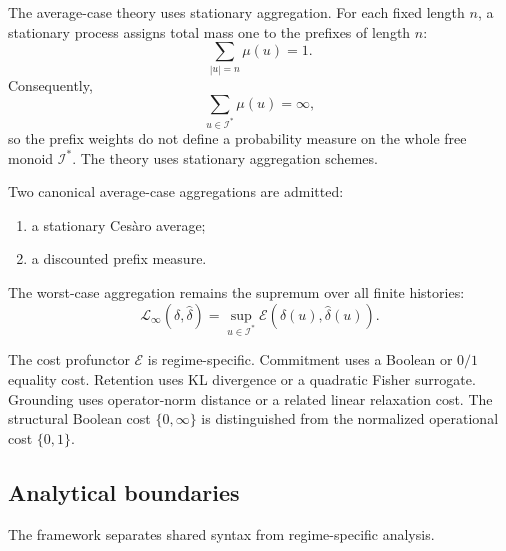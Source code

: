 \documentclass[12pt]{article}
\theoremstyle{definition}
\begin{document}
The average-case theory uses stationary aggregation.  For each fixed length
$n$, a stationary process assigns total mass one to the prefixes of length $n$:
\[
\sum_{|u|=n}\mu(u)=1.
\]
Consequently,
\[
\sum_{u\in\mathcal I^*}\mu(u)=\infty,
\]
so the prefix weights do not define a probability measure on the whole free
monoid $\mathcal I^*$.  The theory uses stationary aggregation schemes.

Two canonical average-case aggregations are admitted:
\begin{enumerate}[nosep,label=(\alph*)]
\item a stationary Ces\`aro average;
\item a discounted prefix measure.
\end{enumerate}

The worst-case aggregation remains the supremum over all finite histories:
\[
\mathcal L_\infty(\delta,\widehat\delta)
=
\sup_{u\in\mathcal I^*}
\mathcal E(\delta(u),\widehat\delta(u)).
\]

The cost profunctor $\mathcal E$ is regime-specific.  Commitment uses a
Boolean or $0/1$ equality cost.  Retention uses KL divergence or a quadratic
Fisher surrogate.  Grounding uses operator-norm distance or a related linear
relaxation cost.  The structural Boolean cost $\{0,\infty\}$ is distinguished
from the normalized operational cost $\{0,1\}$.

\subsection{Analytical boundaries}
\label{subsec:boundaries-intro}

The framework separates shared syntax from regime-specific analysis.
\end{document}
